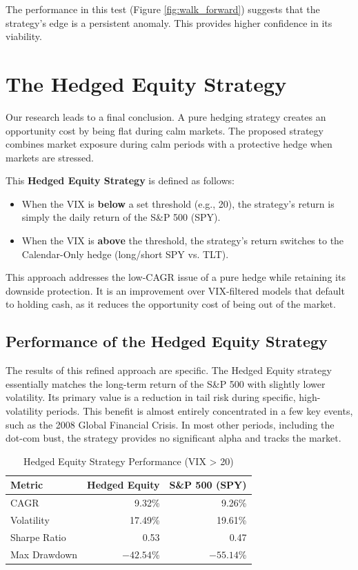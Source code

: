 \documentclass{article}
\begin{document}
The performance in this test (Figure \ref{fig:walk_forward}) suggests that the strategy's edge is a persistent anomaly. This provides higher confidence in its viability.

\section{The Hedged Equity Strategy}
Our research leads to a final conclusion. A pure hedging strategy creates an opportunity cost by being flat during calm markets. The proposed strategy combines market exposure during calm periods with a protective hedge when markets are stressed.

This \textbf{Hedged Equity Strategy} is defined as follows:
\begin{itemize}
    \item When the VIX is \textbf{below} a set threshold (e.g., 20), the strategy's return is simply the daily return of the S\&P 500 (SPY).
    \item When the VIX is \textbf{above} the threshold, the strategy's return switches to the Calendar-Only hedge (long/short SPY vs. TLT).
\end{itemize}

This approach addresses the low-CAGR issue of a pure hedge while retaining its downside protection. It is an improvement over VIX-filtered models that default to holding cash, as it reduces the opportunity cost of being out of the market.

\subsection{Performance of the Hedged Equity Strategy}
The results of this refined approach are specific. The Hedged Equity strategy essentially matches the long-term return of the S\&P 500 with slightly lower volatility. Its primary value is a reduction in tail risk during specific, high-volatility periods. This benefit is almost entirely concentrated in a few key events, such as the 2008 Global Financial Crisis. In most other periods, including the dot-com bust, the strategy provides no significant alpha and tracks the market.

\begin{table}[htbp]
\centering
\caption{Hedged Equity Strategy Performance (VIX > 20)}
\begin{tabular}{lrr}
\toprule
\textbf{Metric} & \textbf{Hedged Equity} & \textbf{S\&P 500 (SPY)} \\
\midrule
CAGR           & 9.32\%    & 9.26\%         \\
Volatility     & 17.49\%   & 19.61\%        \\
Sharpe Ratio   & 0.53      & 0.47           \\
Max Drawdown   & $-42.54$\% & $-55.14$\%      \\
\bottomrule
\end{tabular}
\end{table}
\end{document}
